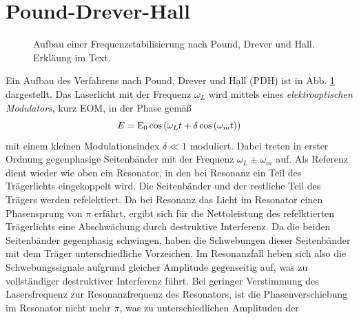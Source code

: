 \section{Pound-Drever-Hall}\label{sec:pound-drever-hall}
\begin{figure}[h]
 	\centering
	\caption[Pound-Drever-Hall - Aufbau]{Aufbau
	einer Frequenzstabilisierung nach Pound, Drever und Hall. Erkläung im
	Text.}\label{fig:pound-drever-hall_aufbau}
\end{figure}
Ein Aufbau des Verfahrens nach Pound, Drever und Hall (PDH) ist in Abb.
\ref{fig:pound-drever-hall_aufbau} dargestellt.
Das Laserlicht mit der Frequenz $\omega_L$ wird mittels eines \textit{elektrooptischen Modulators}, kurz EOM, in der Phase gemäß
\begin{equation}\label{eq:pound-drever-hall_01}
	E=\operatorname{E}_0\cos{\left(\omega_Lt+\delta\cos{(\omega_mt)}\right)}
\end{equation}
mit einem kleinen Modulationsindex $\delta\ll1$ moduliert. Dabei treten in
erster Ordnung gegenphasige Seitenbänder mit der Frequenz $\omega_L\pm\omega_m$
auf. Als Referenz dient wieder wie oben ein Resonator, in den bei Resonanz ein
Teil des Trägerlichts eingekoppelt wird. Die Seitenbänder und der restliche Teil
des Trägers werden refelektiert. Da bei Resonanz das Licht im Resonator einen
Phasensprung von $\pi$ erfährt, ergibt sich für die Nettoleistung des
refelktierten Trägerlichts eine Abschwächung durch destruktive Interferenz.
Da die beiden Seitenbänder gegenphasig schwingen, haben die Schwebungen dieser
Seitenbänder mit dem Träger unterschiedliche Vorzeichen. Im Resonanzfall heben
sich also die Schwebungssignale aufgrund gleicher Amplitude gegenseitig auf, was
zu vollständiger destruktiver Interferenz führt. Bei geringer Verstimmung des
Lasersfrequenz zur Resonanzfrequenz des Resonators, ist die Phasenverschiebung
im Resonator nicht mehr $\pi$, was zu unterschiedlichen Amplituden der
